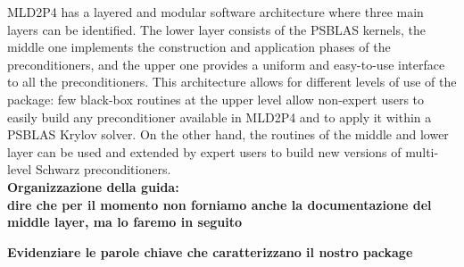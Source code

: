 MLD2P4 has a layered and modular software architecture where three main layers can be identified. The lower layer consists of the PSBLAS kernels, the middle one implements
the construction and application phases of the preconditioners, and the upper one
provides a uniform and easy-to-use interface to all the preconditioners. 
This architecture allows for different levels of use of the package:
few black-box routines at the upper level allow non-expert users to easily
build any preconditioner available in MLD2P4 and to apply it within a PSBLAS Krylov solver.
On the other hand, the routines of the middle and lower layer can be used and extended
by expert users to build new versions of multi-level Schwarz preconditioners.\\

\textbf{Organizzazione della guida:\\
dire che per il momento non
forniamo anche la documentazione del middle layer, ma lo faremo in seguito\\}

\textbf{Evidenziare le parole chiave che caratterizzano il nostro package}

